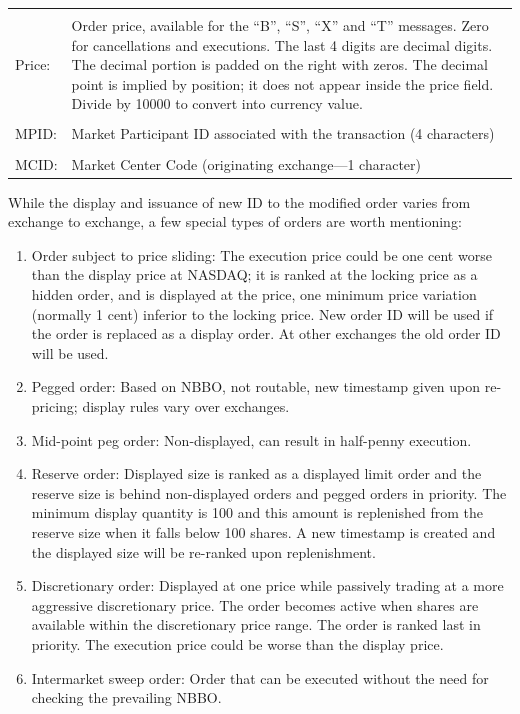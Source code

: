 \begin{table}[!ht]
\begin{tabular}{lp{}}
	& \\
	Price: & Order price, available for the ``B'', ``S'', ``X'' and ``T'' messages. \newline Zero for cancellations and executions. The last 4 digits are decimal digits. The decimal portion is padded on the right with zeros. The decimal point is implied by position; it does not appear inside the price field. Divide by 10000 to convert into currency value. \\ 
	& \\
	MPID: & Market Participant ID associated with the transaction (4 characters) \\
	& \\
	MCID: & Market Center Code (originating exchange---1 character) 
	\end{tabular}
	\end{table}
	

While the display and issuance of new ID to the modified order varies from exchange to exchange, a few special types of orders are worth mentioning:
        \begin{enumerate}[1.]
        \item Order subject to price sliding: The execution price could be one cent worse than the display price at NASDAQ; it is ranked at the locking price as a hidden order, and is displayed at the price, one minimum price variation (normally 1 cent) inferior to the locking price. New order ID will be used if the order is replaced as a display order. At other exchanges the old order ID will be used.
        \item Pegged order: Based on NBBO, not routable, new timestamp given upon re-pricing; display rules vary over exchanges.
        \item Mid-point peg order: Non-displayed, can result in half-penny execution.
        \item Reserve order: Displayed size is ranked as a displayed limit order and the reserve size is behind non-displayed orders and pegged orders in priority. The minimum display quantity is 100 and this amount is replenished from the reserve size when it falls below 100 shares. A new timestamp is created and the displayed size will be re-ranked upon replenishment.
        \item Discretionary order: Displayed at one price while passively trading at a more aggressive discretionary price. The order becomes active when shares are available within the discretionary price range. The order is ranked last in priority. The execution price could be worse than the display price.
        \item Intermarket sweep order: Order that can be executed without the need for checking the prevailing NBBO.  
        \end{enumerate}


